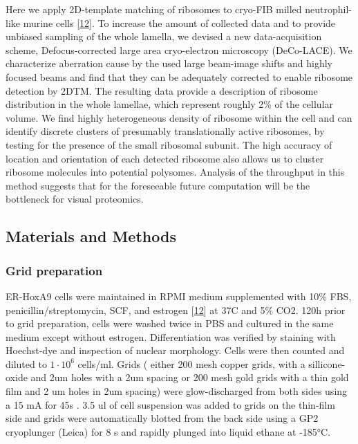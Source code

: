 \documentclass[
]{article}
\begin{document}
Here we apply 2D-template matching of ribosomes to cryo-FIB milled
neutrophil-like murine cells {[}\protect\hyperlink{ref-1B9Vt9eYu}{12}{]}. To increase the
amount of collected data and to provide unbiased sampling of the whole
lamella, we devised a new data-acquisition scheme, Defocus-corrected
large area cryo-electron microscopy (DeCo-LACE). We characterize
aberration cause by the used large beam-image shifts and highly focused
beams and find that they can be adequately corrected to enable ribosome
detection by 2DTM. The resulting data provide a description of ribosome
distribution in the whole lamellae, which represent roughly 2\% of the
cellular volume. We find highly heterogeneous density of ribosome within
the cell and can identify discrete clusters of presumably
translationally active ribosomes, by testing for the presence of the
small ribosomal subunit. The high accuracy of location and orientation
of each detected ribosome also allows us to cluster ribosome molecules
into potential polysomes. Analysis of the throughput in this method
suggests that for the foreseeable future computation will be the
bottleneck for visual proteomics.

\hypertarget{materials-and-methods}{%
\subsection{Materials and Methods}\label{materials-and-methods}}

\hypertarget{grid-preparation}{%
\subsubsection{Grid preparation}\label{grid-preparation}}

ER-HoxA9 cells were maintained in RPMI medium supplemented with 10\% FBS,
penicillin/streptomycin, SCF, and estrogen {[}\protect\hyperlink{ref-1B9Vt9eYu}{12}{]} at
37C and 5\% CO2. 120h prior to grid preparation, cells were washed twice in PBS
and cultured in the same medium except without estrogen. Differentiation was
verified by staining with Hoechst-dye and inspection of nuclear morphology.
Cells were then counted and diluted to \(1\cdot10^6\) cells/ml. Grids ( either 200 mesh
copper grids, with a sillicone-oxide and 2um holes with a 2um spacing or 200
mesh gold grids with a thin gold film and 2 um holes in 2um spacing) were
glow-discharged from both sides using a 15 mA for 45s . 3.5 ul of cell
suspension was added to grids on the thin-film side and grids were automatically
blotted from the back side using a GP2 cryoplunger (Leica) for 8 s and rapidly
plunged into liquid ethane at -185°C.
\end{document}
